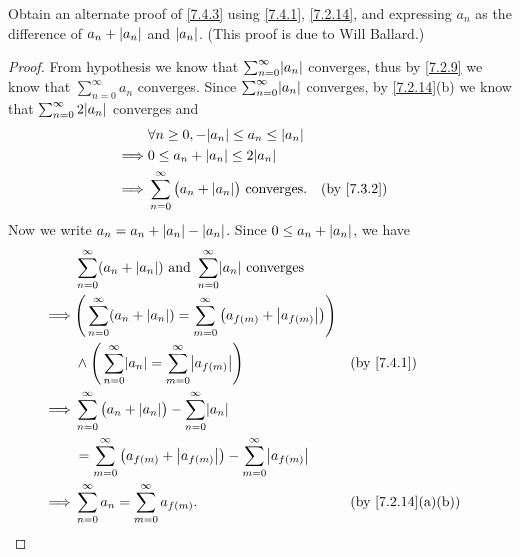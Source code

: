 \begin{ex}\label{ex:7.4.2}
  Obtain an alternate proof of \cref{7.4.3} using \cref{7.4.1}, \cref{7.2.14}, and expressing \(a_n\) as the difference of \(a_n + \left\lvert a_n\right\rvert\) and \(\left\lvert a_n\right\rvert\).
  (This proof is due to Will Ballard.)
\end{ex}

\begin{proof}
  From hypothesis we know that \(\sum_{n = 0}^\infty \abs{a_n}\) converges, thus by \cref{7.2.9} we know that \(\sum_{n = 0}^\infty a_n\) converges.
  Since \(\sum_{n = 0}^\infty \abs{a_n}\) converges, by \cref{7.2.14}(b) we know that \(\sum_{n = 0}^\infty 2 \abs{a_n}\) converges and
  \begin{align*}
             & \forall n \geq 0, -\abs{a_n} \leq a_n \leq \abs{a_n}                             \\
    \implies & 0 \leq a_n + \abs{a_n} \leq 2\abs{a_n}                                           \\
    \implies & \sum_{n = 0}^\infty \big(a_n + \abs{a_n}\big) \text{ converges}. &  & \by{7.3.2}
  \end{align*}
  Now we write \(a_n = a_n + \left\lvert a_n\right\rvert - \left\lvert a_n\right\rvert\).
  Since \(0 \leq a_n + \left\lvert a_n\right\rvert\), we have
  \begin{align*}
             & \sum_{n = 0}^\infty (a_n + \abs{a_n}) \text{ and } \sum_{n = 0}^\infty \abs{a_n} \text{ converges}                                               \\
    \implies & \Bigg(\sum_{n = 0}^\infty (a_n + \abs{a_n}) = \sum_{m = 0}^\infty \big(a_{f(m)} + \abs{a_{f(m)}}\big)\Bigg)                                      \\
             & \land \Bigg(\sum_{n = 0}^\infty \abs{a_n} = \sum_{m = 0}^\infty \abs{a_{f(m)}}\Bigg)                        &  & \by{7.4.1}                      \\
    \implies & \sum_{n = 0}^\infty \big(a_n + \abs{a_n}\big) - \sum_{n = 0}^\infty \abs{a_n}                                                                    \\
             & = \sum_{m = 0}^\infty \big(a_{f(m)} + \abs{a_{f(m)}}\big) - \sum_{m = 0}^\infty \abs{a_{f(m)}}                                                   \\
    \implies & \sum_{n = 0}^\infty a_n = \sum_{m = 0}^\infty a_{f(m)}.                                                     &  & \text{(by \cref{7.2.14}(a)(b))}
  \end{align*}
\end{proof}